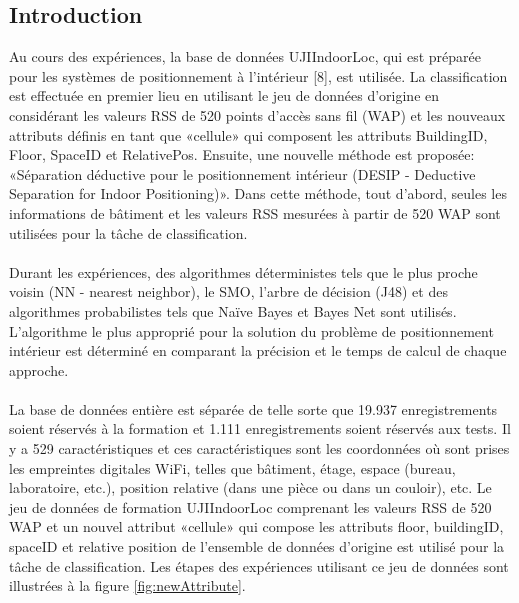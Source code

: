 \subsection{Introduction}
Au cours des expériences, la base de données UJIIndoorLoc, qui est préparée pour les systèmes de positionnement à l'intérieur [8], est utilisée. La classification est effectuée en premier lieu en utilisant le jeu de données d'origine en considérant les valeurs RSS de 520 points d'accès sans fil (WAP) et les nouveaux attributs définis en tant que «cellule» qui composent les attributs BuildingID, Floor, SpaceID et RelativePos. Ensuite, une nouvelle méthode est proposée: «Séparation déductive pour le positionnement intérieur (DESIP - Deductive Separation for Indoor Positioning)». Dans cette méthode, tout d'abord, seules les informations de bâtiment et les valeurs RSS mesurées à partir de 520 WAP sont utilisées pour la tâche de classification.
\\
\\
Durant les expériences, des algorithmes déterministes tels que le plus proche voisin (NN - nearest neighbor), le SMO, l'arbre de décision (J48) et des algorithmes probabilistes tels que Naïve Bayes et Bayes Net sont utilisés. L’algorithme le plus approprié pour la solution du problème de positionnement intérieur est déterminé en comparant la précision et le temps de calcul de chaque approche.
\\
\\
La base de données entière est séparée de telle sorte que 19.937 enregistrements soient réservés à la formation et 1.111 enregistrements soient réservés aux tests. Il y a 529 caractéristiques et ces caractéristiques sont les coordonnées où sont prises les empreintes digitales WiFi, telles que bâtiment, étage, espace (bureau, laboratoire, etc.), position relative (dans une pièce ou dans un couloir), etc. Le jeu de données de formation UJIIndoorLoc comprenant les valeurs RSS de 520 WAP et un nouvel attribut «cellule» qui compose les attributs floor, buildingID, spaceID et relative position de l'ensemble de données d'origine est utilisé pour la tâche de classification. Les étapes des expériences utilisant ce jeu de données sont illustrées à la figure \ref{fig:newAttribute}.

